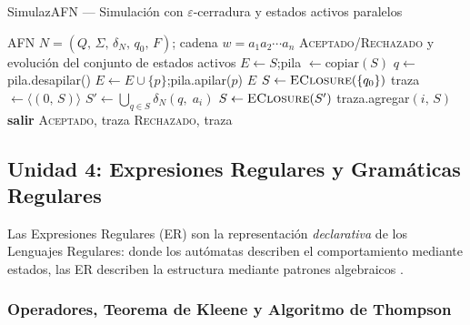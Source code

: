 \begin{algobox}{SimulazAFN — Simulación con $\varepsilon$-cerradura y estados activos paralelos}
\begin{algorithmic}[1]
  \Require AFN $N = (Q,\,\Sigma,\,\delta_N,\,q_0,\,F)$;\; cadena $w = a_1 a_2 \cdots a_n$
  \Ensure  \textsc{Aceptado}/\textsc{Rechazado} y evolución del conjunto de estados activos
  \State
   
    \State $E \gets S$;\quad pila $\gets \text{copiar}(S)$
      \State $q \gets$ pila.desapilar()
          \State $E \gets E \cup \{p\}$;\quad pila.apilar($p$)
        \EndIf
      \EndFor
    \EndWhile
    \State \Return $E$
  \EndFunction
  \State
  \State $S \gets \Call{EClosure}{\{q_0\}}$ 
  \State traza $\gets \langle(0,\,S)\rangle$
    \State $S' \gets \displaystyle\bigcup_{q \in S}\delta_N(q,\; a_i)$ 
    \State $S  \gets \Call{EClosure}{S'}$ 
    \State traza.agregar$(i,\, S)$
      \State \textbf{salir} 
    \EndIf
  \EndFor
  \State
    \State \Return \textsc{Aceptado}, traza
  \Else
    \State \Return \textsc{Rechazado}, traza
  \EndIf
\end{algorithmic}
\end{algobox}

\subsection*{Unidad 4: Expresiones Regulares y Gramáticas Regulares}

Las Expresiones Regulares (ER) son la representación \emph{declarativa} de los Lenguajes
Regulares: donde los autómatas describen el comportamiento mediante estados, las ER describen
la estructura mediante patrones algebraicos \cite{sipser2012}.

\subsubsection*{Operadores, Teorema de Kleene y Algoritmo de Thompson}

